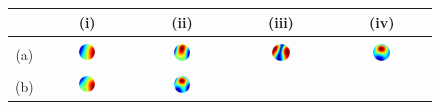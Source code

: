 \documentclass[authoryear,preprint,12pt]{elsarticle}
\begin{document}
\begin{figure}[!htbp]
  \begin{center}
    \begin{tabular}{c|cccc}
      & (i) & (ii) & (iii) & (iv)\\
      \hline
      \\
      (a) & \includegraphics[width=0.2\textwidth]{try3460ny.ps} &
      \includegraphics[width=0.2\textwidth]{try3160ny.ps} &
      \includegraphics[width=0.2\textwidth]{try3260ny.ps} & 
      \includegraphics[width=0.2\textwidth]{try3360ny.ps}\\
      \\
      (b) & \includegraphics[width=0.2\textwidth]{try3490ny.ps} &
      \includegraphics[width=0.2\textwidth]{try3190ny.ps} &

\end{tabular}
\end{center}
\end{figure}
\end{document}
